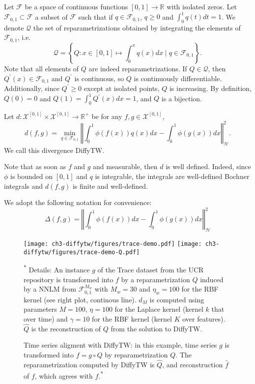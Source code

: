 Let $\mathcal F$ be a space of continuous functions $[0, 1] \to \mathbb R$ with isolated zeros. Let $\mathcal F_{0,1} \subset \mathcal F$ a subset of $\mathcal F$ such that if $q\in\mathcal F_{0,1}$, $q \geq 0$ and $\int_0^1q(t)dt =1$. We denote $\mathcal Q$ the set of reparametrizations obtained by integrating the elements of $\mathcal F_{0,1}$, i.e.
\begin{equation}\label{eq:Q-from-F}
    \mathcal Q = \left\lbrace Q: x\in[0,1] \mapsto \int_0^x q(x)dx \mid q \in \mathcal F_{0,1}\right\rbrace.
\end{equation}
Note that all elements of $Q$ are indeed reparametrizations. If $Q\in\mathcal Q$, then $Q^\prime(x) \in\mathcal F_{0,1}$ and $Q^\prime$ is continuous, so $Q$ is continuously differentiable. Additionally, since $Q^\prime \geq 0$ except at isolated points, $Q$ is increasing. By definition, $Q(0)=0$ and $Q(1)=\int_0^1 Q^\prime(x)dx =1$, and $Q$ is a bijection.

\begin{definition}[DiffyTW]\label{def:diffytw}
Let $d: \mathcal X^{[0,1]} \times \mathcal X^{[0,1]} \to \mathbb R^+$ be for any $f, g\in\mathcal X^{[0,1]}$,
\begin{equation}\label{eq:diffytw}
    d(f, g) = \min_{q \in \mathcal F_{0,1}}\left\Vert \int_0^1 \phi(f(x))q(x)dx - \int_0^1\phi(g(x))dx\right\Vert^2_\mathcal H.
\end{equation}
We call this divergence DiffyTW.
\end{definition}
Note that as soon as $f$ and $g$ and measurable, then $d$ is well defined. Indeed, since $\phi$ is bounded on $[0,1]$ and $q$ is integrable, the integrals are well-defined Bochner integrals and $d(f, g)$ is finite and well-defined.

We adopt the following notation for convenience:
\begin{equation}\label{def:diffytw-delta}
\Delta(f , g) = \left\Vert \int_0^1 \phi(f(x))dx - \int_0^1\phi(g(x))dx\right\Vert^2_\mathcal H
\end{equation}


\begin{figure}[ht!]
\begin{center}
\texttt{[image: ch3-diffytw/figures/trace-demo.pdf]}
\texttt{[image: ch3-diffytw/figures/trace-demo-Q.pdf]}
\end{center}
\caption[Time series alignment with DiffyTW]{Time series aligment with DiffyTW: in this example, time series $g$ is transformed into $f=g\circ Q$ by reparametrization $Q$. The reparametrization computed by DiffyTW is $\hat Q$, and reconstruction $\hat f$ of $f$, which agrees with $f$.\textsuperscript{*}}
\small\textsuperscript{*} Details: An instance $g$ of the Trace dataset from the UCR repository is transformed into $f$ by a reparametrization $Q$ induced by a NNLM from $\mathcal F_{0,1}^{M_w}$ with $M_{w}=30$ and $\eta_w= 100$ for the RBF kernel (see right plot, continous line). $\hat d_M$ is computed using parameters $M=100$, $\eta =100$ for the Laplace kernel (kernel $k$ that over time) and $\gamma=10$ for the RBF kernel (kernel $K$ over features). $\hat Q$ is the reconstruction of $Q$ from the solution to DiffyTW.
\end{figure}


